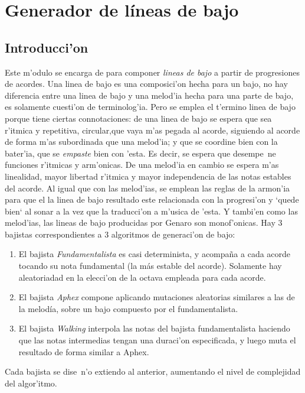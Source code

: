 ﻿\chapter{Generador de l\'ineas de bajo}
\section{Introducci'on}
Este m'odulo se encarga de para componer \emph{lineas de bajo} a partir de progresiones de acordes. Una linea de bajo es una composici'on hecha para un bajo, no hay diferencia entre una linea de bajo y una melod'ia hecha para una parte de bajo, es solamente cuesti'on de terminolog'ia. Pero se emplea el t'ermino linea de bajo porque tiene ciertas connotaciones: de una linea de bajo se espera que sea r'itmica y repetitiva, circular,que vaya m'as pegada al acorde, siguiendo al acorde de forma m'as subordinada que una melod'ia; y que se coordine bien con la bater'ia, que se \emph{empaste} bien con 'esta. Es decir, se espera que desempe~ne funciones r'itmicas y arm'onicas. De una melod'ia en cambio se espera m'as linealidad, mayor libertad r'itmica y mayor independencia de las notas estables del acorde.\newline
Al igual que con las melod'ias, se emplean las reglas de la armon'ia para que el la linea de bajo resultado este relacionada con la progresi'on y `quede bien` al sonar a la vez que la traducci'on a m'usica de 'esta. Y tambi'en como las melod'ias, las lineas de bajo producidas por Genaro son monof'onicas.\newline
Hay 3 bajistas correspondientes a 3 algoritmos de generaci'on de bajo: 
        \begin{enumerate}
        \item El bajista \emph{Fundamentalista} es casi determinista, y acompaña a cada acorde tocando su nota fundamental (la más estable del acorde). Solamente hay aleatoriadad en la elecci'on de la octava empleada para cada acorde.
        \item El bajista \emph{Aphex} compone aplicando mutaciones aleatorias similares a las de la melodía, sobre un bajo compuesto por el fundamentalista.
        \item El bajista \emph{Walking} interpola las notas del bajista fundamentalista haciendo que las notas intermedias tengan una duraci'on especificada, y luego muta el resultado de forma similar a Aphex.
        \end{enumerate}
Cada bajista se dise~n'o extiendo al anterior, aumentando el nivel de complejidad del algor'itmo.
	
